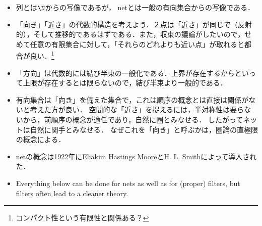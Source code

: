 \documentclass[uplatex,dvipdfmx]{jsreport}
\begin{document}
\begin{tcolorbox}[colframe=ForestGreen, colback=ForestGreen!10!white,breakable,colbacktitle=ForestGreen!40!white,coltitle=black,fonttitle=\bfseries\sffamily,
title=]
    \begin{itemize}
        \item  列とは$\N$からの写像であるが，
        netとは一般の有向集合からの写像である．
        \item 「向き」「近さ」の代数的構造を考えよう．２点は「近さ」が同じで（反射的），そして推移的であるはずである．また，収束の議論がしたいので，せめて任意の有限集合に対して，「それらのどれよりも近い点」が取れると都合が良い．\footnote{コンパクト性という有限性と関係ある？}
        \item 「方向」は代数的には結び半束の一般化である．上界が存在するからといって上限が存在するとは限らないので，結び半束より一般的である．
        \item 有向集合は「向き」を備えた集合で，これは順序の概念とは直接は関係がないと考えた方が良い．
        空間的な「近さ」を捉えるには，半対称性は要らないから，前順序の概念が適任であり，自然に圏とみなせる．
        したがってネットは自然に関手とみなせる．
        なぜこれを「向き」と呼ぶかは，圏論の直極限の概念による．
        \item netの概念は1922年にEliakim Hastings MooreとH. L. Smithによって導入された．
        \item Everything below can be done for nets as well as for (proper) filters, but filters often lead to a cleaner theory.
    \end{itemize}
\end{tcolorbox}
\end{document}
